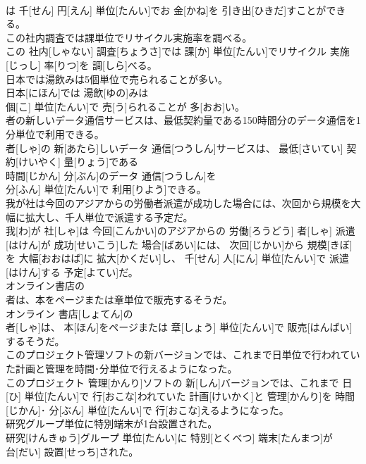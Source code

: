 \documentclass[8pt]{extreport}
\begin{document}
\begin{CJK}{UTF8}{min}
\\	は 千[せん] 円[えん] 単位[たんい]でお 金[かね]を 引き出[ひきだ]すことができる。
\\	この社内調査では課単位でリサイクル実施率を調べる。	
\\	この 社内[しゃない] 調査[ちょうさ]では 課[か] 単位[たんい]でリサイクル 実施[じっし] 率[りつ]を 調[しら]べる。
\\	日本では湯飲みは5個単位で売られることが多い。	
\\	日本[にほん]では 湯飲[ゆの]みは 
\\	個[こ] 単位[たんい]で 売[う]られることが 多[おお]い。
\\	者の新しいデータ通信サービスは、最低契約量である150時間分のデータ通信を1分単位で利用できる。	
\\	者[しゃ]の 新[あたら]しいデータ 通信[つうしん]サービスは、 最低[さいてい] 契約[けいやく] 量[りょう]である 
\\	時間[じかん] 分[ぶん]のデータ 通信[つうしん]を 
\\	分[ふん] 単位[たんい]で 利用[りよう]できる。
\\	我が社は今回のアジアからの労働者派遣が成功した場合には、次回から規模を大幅に拡大し、千人単位で派遣する予定だ。	
\\	我[わ]が 社[しゃ]は 今回[こんかい]のアジアからの 労働[ろうどう] 者[しゃ] 派遣[はけん]が 成功[せいこう]した 場合[ばあい]には、 次回[じかい]から 規模[きぼ]を 大幅[おおはば]に 拡大[かくだい]し、 千[せん] 人[にん] 単位[たんい]で 派遣[はけん]する 予定[よてい]だ。
\\	オンライン書店の
\\	者は、本をページまたは章単位で販売するそうだ。	
\\	オンライン 書店[しょてん]の 
\\	者[しゃ]は、 本[ほん]をページまたは 章[しょう] 単位[たんい]で 販売[はんばい]するそうだ。
\\	このプロジェクト管理ソフトの新バージョンでは、これまで日単位で行われていた計画と管理を時間･分単位で行えるようになった。	
\\	このプロジェクト 管理[かんり]ソフトの 新[しん]バージョンでは、これまで 日[ひ] 単位[たんい]で 行[おこな]われていた 計画[けいかく]と 管理[かんり]を 時間[じかん]･ 分[ぶん] 単位[たんい]で 行[おこな]えるようになった。
\\	研究グループ単位に特別端末が1台設置された。	
\\	研究[けんきゅう]グループ 単位[たんい]に 特別[とくべつ] 端末[たんまつ]が 
\\	台[だい] 設置[せっち]された。

\end{CJK}
\end{document}
